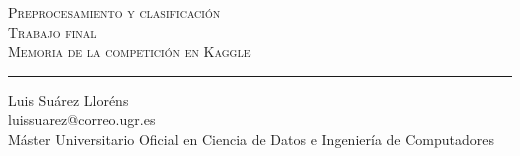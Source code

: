 \begin{titlepage}

\newcommand{\HRule}{\rule{\linewidth}{0.5mm}} %

\center %
 

\textsc{\LARGE Preprocesamiento y clasificación}\\[1.0cm] %
\textsc{\Large Trabajo final}\\[0.5cm] %
\textsc{\large Memoria de la competición en Kaggle}\\[0.5cm] %



 
\HRule
\vspace{2cm}

\begin{minipage}{1\textwidth}
\begin{flushleft} \small
Luis Suárez Lloréns\\
luissuarez@correo.ugr.es\\
Máster Universitario Oficial en Ciencia de Datos e Ingeniería de Computadores
\end{flushleft}
\end{minipage}




 

\vfill %

\end{titlepage}
\tableofcontents
\listoftodos
\newpage
